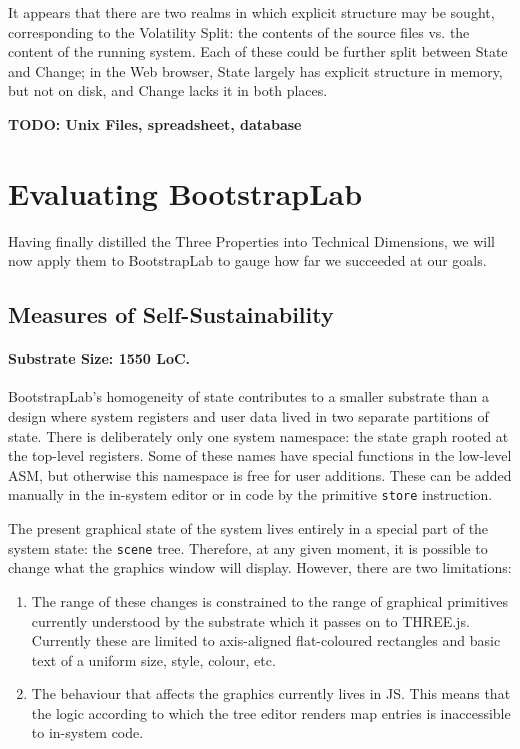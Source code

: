 \documentclass[ twoside,openright,titlepage,numbers=noenddot,headinclude,footinclude,cleardoublepage=empty,abstract=on,
                BCOR=5mm,paper=a4,fontsize=11pt
                ]{scrreprt}
\newcommand{\todo}[1]{\textbf{TODO: #1}}
\newcommand{\criterion}{\paragraph}
\providecommand{\tightlist}{}\newenvironment{longtable}[2]{\begin{tabular}}{\end{tabular}}
\theoremstyle{definition}
\begin{document}
{It appears that there are two realms in which explicit structure may be sought, corresponding to the Volatility Split: the contents of the source files vs. the content of the running system. Each of these could be further split between State and Change; in the Web browser, State largely has explicit structure in memory, but not on disk, and Change lacks it in both places.

\todo{Unix Files, spreadsheet, database}
}

\hypertarget{evaluating-bootstraplab}{\section{Evaluating BootstrapLab}\label{evaluating-bootstraplab}}

Having finally distilled the Three Properties into Technical Dimensions,
we will now apply them to BootstrapLab to gauge how far we succeeded at
our goals.

\hypertarget{measures-of-self-sustainability}{\subsection{Measures of
Self-Sustainability}\label{measures-of-self-sustainability}}

\criterion{Substrate Size: 1550 LoC.}

BootstrapLab's homogeneity of state contributes to a smaller substrate
than a design where system registers and user data lived in two separate
partitions of state. There is deliberately only one system namespace:
the state graph rooted at the top-level registers. Some of these names
have special functions in the low-level ASM, but otherwise this
namespace is free for user additions. These can be added manually in the
in-system editor or in code by the primitive \texttt{store} instruction.

The present graphical state of the system lives entirely in a special
part of the system state: the \texttt{scene} tree. Therefore, at any
given moment, it is possible to change what the graphics window will
display. However, there are two limitations:

\begin{enumerate}
\def\labelenumi{\arabic{enumi}.}
\tightlist
\item
  The range of these changes is constrained to the range of graphical
  primitives currently understood by the substrate which it passes on to
  THREE.js. Currently these are limited to axis-aligned flat-coloured
  rectangles and basic text of a uniform size, style, colour, etc.
\item
  The behaviour that affects the graphics currently lives in \ac{JS}.
  This means that the logic according to which the tree editor renders
  map entries is inaccessible to in-system code.
\end{enumerate}
\end{document}
